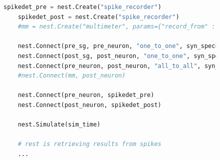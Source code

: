 \begin{figure}[ht!]
\begin{lstlisting}[language=Python]
    spikedet_pre = nest.Create("spike_recorder")
    spikedet_post = nest.Create("spike_recorder")
    #mm = nest.Create("multimeter", params={"record_from" : ["V_m"]})

    nest.Connect(pre_sg, pre_neuron, "one_to_one", syn_spec={"delay": 1.})
    nest.Connect(post_sg, post_neuron, "one_to_one", syn_spec={"delay": 1., "weight": 9999.})
    nest.Connect(pre_neuron, post_neuron, "all_to_all", syn_spec={'synapse_model': 'stdp_nestml_rec'})
    #nest.Connect(mm, post_neuron)

    nest.Connect(pre_neuron, spikedet_pre)
    nest.Connect(post_neuron, spikedet_post)
    
    nest.Simulate(sim_time)
    
    # rest is retrieving results from spikes
    ...

\end{lstlisting}
\label{fig:build_network_without_jit}
\end{figure}

\clearpage

